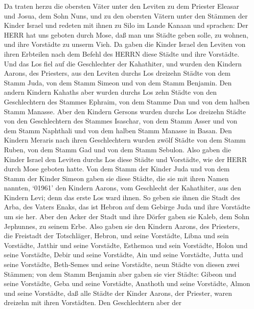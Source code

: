  Da traten herzu die obersten Väter unter den Leviten zu dem
Priester Eleasar und Josua, dem Sohn Nuns, und zu den obersten Vätern
unter den Stämmen der Kinder Israel  und redeten mit ihnen
zu Silo im Lande Kanaan und sprachen: Der HERR hat uns geboten durch
Mose, daß man uns Städte geben solle, zu wohnen, und ihre Vorstädte zu
unserm Vieh.  Da gaben die Kinder Israel den Leviten von
ihren Erbteilen nach dem Befehl des HERRN diese Städte und ihre
Vorstädte.  Und das Los fiel auf die Geschlechter der
Kahathiter, und wurden den Kindern Aarons, des Priesters, aus den
Leviten durchs Los dreizehn Städte von dem Stamm Juda, von dem Stamm
Simeon und von dem Stamm Benjamin.  Den andern Kindern
Kahaths aber wurden durchs Los zehn Städte von den Geschlechtern des
Stammes Ephraim, von dem Stamme Dan und von dem halben Stamm Manasse.
 Aber den Kindern Gersons wurden durchs Los dreizehn Städte
von den Geschlechtern des Stammes Isaschar, von dem Stamm Asser und von
dem Stamm Naphthali und von dem halben Stamm Manasse in Basan.
 Den Kindern Meraris nach ihren Geschlechtern wurden zwölf
Städte von dem Stamm Ruben, von dem Stamm Gad und von dem Stamm Sebulon.
 Also gaben die Kinder Israel den Leviten durchs Los diese
Städte und Vorstädte, wie der HERR durch Mose geboten hatte.
 Von dem Stamm der Kinder Juda und von dem Stamm der Kinder
Simeon gaben sie diese Städte, die sie mit ihren Namen nannten,
 `01961' den Kindern Aarons, vom Geschlecht der Kahathiter,
aus den Kindern Levi; denn das erste Los ward ihnen.  So
geben sie ihnen die Stadt des Arba, des Vaters Enaks, das ist Hebron auf
dem Gebirge Juda und ihre Vorstädte um sie her.  Aber den
Acker der Stadt und ihre Dörfer gaben sie Kaleb, dem Sohn Jephunnes, zu
seinem Erbe.  Also gaben sie den Kindern Aarons, des
Priesters, die Freistadt der Totschläger, Hebron, und seine Vorstädte,
Libna und sein Vorstädte,  Jatthir und seine Vorstädte,
Esthemoa und sein Vorstädte,  Holon und seine Vorstädte,
Debir und seine Vorstädte,  Ain und seine Vorstädte, Jutta
und seine Vorstädte, Beth-Semes und seine Vorstädte, neun Städte von
diesen zwei Stämmen;  von dem Stamm Benjamin aber gaben sie
vier Städte: Gibeon und seine Vorstädte, Geba und seine Vorstädte,
 Anathoth und seine Vorstädte, Almon und seine Vorstädte,
 daß alle Städte der Kinder Aarons, der Priester, waren
dreizehn mit ihren Vorstädten.  Den Geschlechtern aber der
